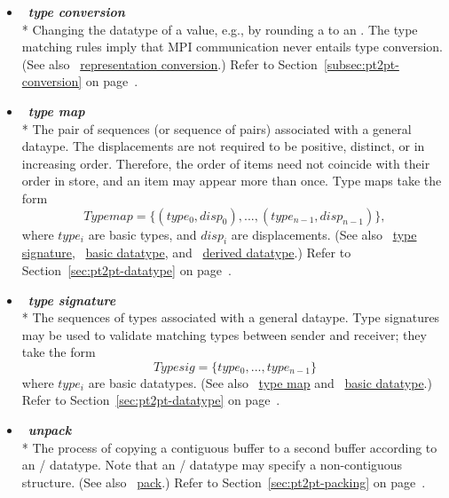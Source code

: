 \begin{itemize}
\label{glossary:type_conversion}
\item  ~\hypertarget{glossary:type_conversion}{\emph{\textbf{type conversion}}} \\*
Changing the datatype of a value, e.g., by rounding a
 to an .  The type matching rules imply that MPI communication
  never entails type conversion.
(See also ~\hyperlink{glossary:representation_conversion}{representation conversion}.)
Refer to Section~\ref{subsec:pt2pt-conversion} on page~\pageref{subsec:pt2pt-conversion}.


\label{glossary:type_map}
\item  ~\hypertarget{glossary:type_map}{\emph{\textbf{type map}}} \\*
The pair of sequences (or sequence of pairs) associated with a general dataype.
The displacements are not required to be positive, distinct, or
in increasing order. Therefore, the order of items need not
coincide with their order in store, and an item may appear more than
once. Type maps take the form
\[
Typemap = \{ (type_0,disp_0), ..., (type_{n-1}, disp_{n-1}) \} ,
\]
where $type_i$ are basic types, and
$disp_i$ are  displacements.
(See also ~\hyperlink{glossary:type_signature}{type signature},
~\hyperlink{glossary:basic_datatype}{basic datatype},
and ~\hyperlink{glossary:derived_datatype}{derived datatype}.)
Refer to Section~\ref{sec:pt2pt-datatype} on page~\pageref{sec:pt2pt-datatype}.

\label{glossary:type_signature}
\item  ~\hypertarget{glossary:type_signature}{\emph{\textbf{type signature}}} \\*
The sequences of types associated with a general dataype.
Type signatures may be used to validate matching types between sender and receiver; they take the form
\[
Typesig = \{ type_0 , ... , type_{n-1} \}
\]
where $type_i$ are basic datatypes.
(See also ~\hyperlink{glossary:type_map}{type map} and ~\hyperlink{glossary:basic_datatype}{basic datatype}.)
Refer to Section~\ref{sec:pt2pt-datatype} on page~\pageref{sec:pt2pt-datatype}.

\label{glossary:unpack}
\item  ~\hypertarget{glossary:unpack}{\emph{\textbf{unpack}}} \\*
The process of copying a contiguous buffer to a second buffer according to an \MPI/ datatype.
Note that an \MPI/ datatype may specify a non-contiguous structure.
(See also ~\hyperlink{glossary:pack}{pack}.)
Refer to Section~\ref{sec:pt2pt-packing} on page~\pageref{sec:pt2pt-packing}.


\end{itemize}
